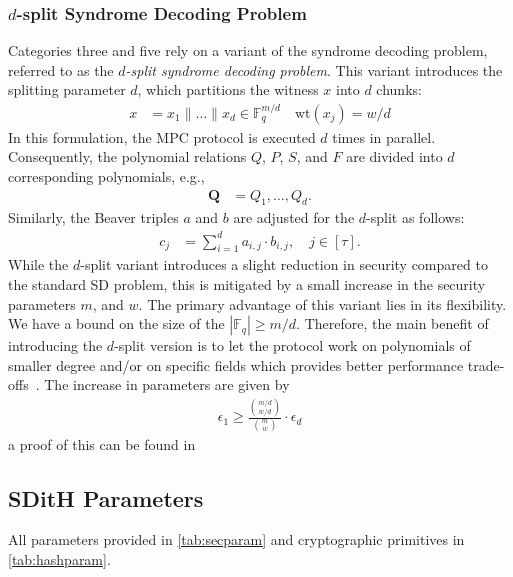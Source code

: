 \documentclass[11pt]{report}
\theoremstyle{definition}
\theoremstyle{plain}
\begin{document}
\subsubsection{$d$-split Syndrome Decoding Problem}

Categories three and five rely on a variant of the syndrome decoding problem, referred to as the \textit{$d$-split syndrome decoding problem}. This variant introduces the splitting parameter $d$, which partitions the witness $x$ into $d$ chunks:
\begin{align*}
  x & = x_1 \| \dots \| x_d \in \mathbb{F}_q^{m/d} \quad \text{wt}(x_j) = w/d
\end{align*}
In this formulation, the MPC protocol is executed $d$ times in parallel. Consequently, the polynomial relations $Q$, $P$, $S$, and $F$ are divided into $d$ corresponding polynomials, e.g.,
\begin{align*}
  \textbf{Q} & = Q_1, \dots, Q_d.
\end{align*}
Similarly, the Beaver triples $a$ and $b$ are adjusted for the $d$-split as follows:
\begin{align*}
  c_j & = \sum_{i=1}^d a_{i,j} \cdot b_{i,j}, \quad j \in [\tau].
\end{align*}
While the $d$-split variant introduces a slight reduction in security compared to the standard SD problem, this is mitigated by a small increase in the security parameters $m$, and $w$. The primary advantage of this variant lies in its flexibility. We have a bound on the size of the $|\mathbb{F}_q| \geq m/d$. Therefore, the main benefit of introducing the $d$-split version is to let the protocol work on polynomials of smaller degree and/or on specific fields which provides better performance trade-offs~\cite{aguilarsyndrome11}. The increase in parameters are given by
\begin{align}
  \epsilon_1 \geq \frac{\binom{m/d}{w/d}}{\binom{m}{w}} \cdot \epsilon_d\label{eq:d_split_epsilon}
\end{align}
a proof of this can be found in~\cite[p27]{feneuil2022syndrome}

\subsection{SDitH Parameters}

All parameters provided in \autoref{tab:secparam} and cryptographic primitives in \autoref{tab:hashparam}.
\end{document}
